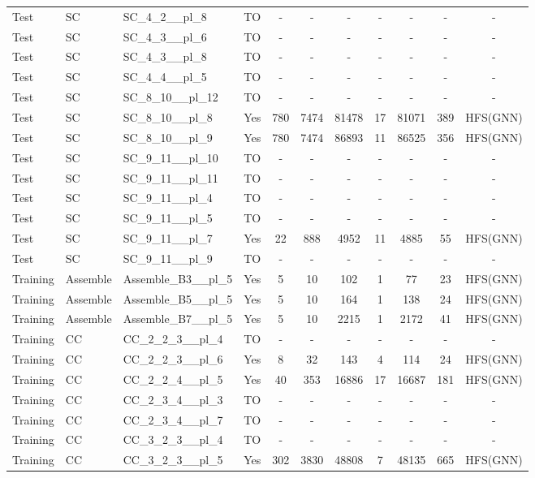 \documentclass{article}
\begin{document}
\begin{tabular}{lllcccccccc}
Test & SC & SC\_4\_2\_\_pl\_8 & TO & - & - & - & - & - & - & - \\
Test & SC & SC\_4\_3\_\_pl\_6 & TO & - & - & - & - & - & - & - \\
Test & SC & SC\_4\_3\_\_pl\_8 & TO & - & - & - & - & - & - & - \\
Test & SC & SC\_4\_4\_\_pl\_5 & TO & - & - & - & - & - & - & - \\
Test & SC & SC\_8\_10\_\_pl\_12 & TO & - & - & - & - & - & - & - \\
Test & SC & SC\_8\_10\_\_pl\_8 & Yes & 780 & 7474 & 81478 & 17 & 81071 & 389 & HFS(GNN) \\
Test & SC & SC\_8\_10\_\_pl\_9 & Yes & 780 & 7474 & 86893 & 11 & 86525 & 356 & HFS(GNN) \\
Test & SC & SC\_9\_11\_\_pl\_10 & TO & - & - & - & - & - & - & - \\
Test & SC & SC\_9\_11\_\_pl\_11 & TO & - & - & - & - & - & - & - \\
Test & SC & SC\_9\_11\_\_pl\_4 & TO & - & - & - & - & - & - & - \\
Test & SC & SC\_9\_11\_\_pl\_5 & TO & - & - & - & - & - & - & - \\
Test & SC & SC\_9\_11\_\_pl\_7 & Yes & 22 & 888 & 4952 & 11 & 4885 & 55 & HFS(GNN) \\
Test & SC & SC\_9\_11\_\_pl\_9 & TO & - & - & - & - & - & - & - \\
Training & Assemble & Assemble\_B3\_\_pl\_5 & Yes & 5 & 10 & 102 & 1 & 77 & 23 & HFS(GNN) \\
Training & Assemble & Assemble\_B5\_\_pl\_5 & Yes & 5 & 10 & 164 & 1 & 138 & 24 & HFS(GNN) \\
Training & Assemble & Assemble\_B7\_\_pl\_5 & Yes & 5 & 10 & 2215 & 1 & 2172 & 41 & HFS(GNN) \\
Training & CC & CC\_2\_2\_3\_\_pl\_4 & TO & - & - & - & - & - & - & - \\
Training & CC & CC\_2\_2\_3\_\_pl\_6 & Yes & 8 & 32 & 143 & 4 & 114 & 24 & HFS(GNN) \\
Training & CC & CC\_2\_2\_4\_\_pl\_5 & Yes & 40 & 353 & 16886 & 17 & 16687 & 181 & HFS(GNN) \\
Training & CC & CC\_2\_3\_4\_\_pl\_3 & TO & - & - & - & - & - & - & - \\
Training & CC & CC\_2\_3\_4\_\_pl\_7 & TO & - & - & - & - & - & - & - \\
Training & CC & CC\_3\_2\_3\_\_pl\_4 & TO & - & - & - & - & - & - & - \\
Training & CC & CC\_3\_2\_3\_\_pl\_5 & Yes & 302 & 3830 & 48808 & 7 & 48135 & 665 & HFS(GNN) \\

\end{tabular}
\end{document}
